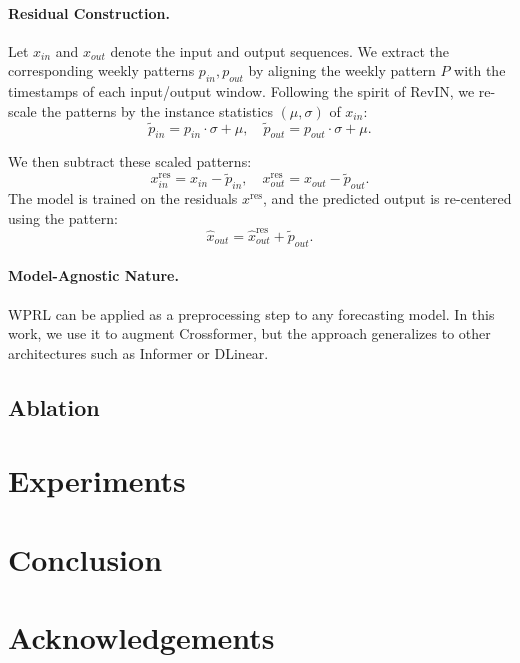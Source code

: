\documentclass{article}
\begin{document}
\paragraph{Residual Construction.}
Let $x_{in}$ and $x_{out}$ denote the input and output sequences. We extract the corresponding weekly patterns $p_{in}, p_{out}$ by aligning the weekly pattern $P$ with the timestamps of each input/output window. Following the spirit of RevIN, we re-scale the patterns by the instance statistics $(\mu, \sigma)$ of $x_{in}$:
\[
\tilde{p}_{in} = p_{in} \cdot \sigma + \mu, \quad \tilde{p}_{out} = p_{out} \cdot \sigma + \mu.
\]

We then subtract these scaled patterns:
\[
x_{in}^{\text{res}} = x_{in} - \tilde{p}_{in}, \quad x_{out}^{\text{res}} = x_{out} - \tilde{p}_{out}.
\]
The model is trained on the residuals $x^{\text{res}}$, and the predicted output is re-centered using the pattern:
\[
\hat{x}_{out} = \hat{x}_{out}^{\text{res}} + \tilde{p}_{out}.
\]

\paragraph{Model-Agnostic Nature.}
WPRL can be applied as a preprocessing step to any forecasting model. In this work, we use it to augment Crossformer, but the approach generalizes to other architectures such as Informer or DLinear.



\subsection{Ablation}

\section{Experiments}

\section{Conclusion}

\section*{Acknowledgements}

\medskip










\end{document}
